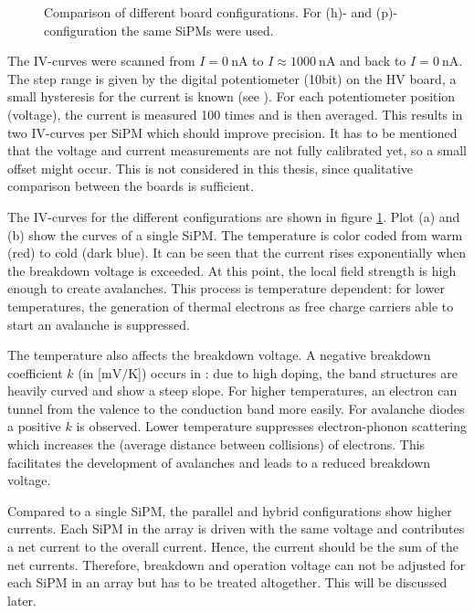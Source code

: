 \begin{figure}[h!]
	\hfill
	\hfill
	\caption[IV-curve of different board configurations]{Comparison of different board configurations. For (h)- and (p)-configuration the same SiPMs were used. }
	\label{fig:ch4:IV_comparison}
\end{figure}
The IV-curves were scanned from $I=\SI{0}{\nano\ampere}$ to $I\approx\SI{1000}{\nano\ampere}$ and back to $I=\SI{0}{\nano\ampere}$. The step range is given by the digital potentiometer (10bit) on the HV board, a small hysteresis for the current is known (see \cite{chris}). For each potentiometer position (voltage), the current is measured 100 times and is then averaged. This results in two IV-curves per SiPM which should improve precision. It has to be mentioned that the voltage and current measurements are not fully calibrated yet, so a small offset might occur. This is not considered in this thesis, since qualitative comparison between the boards is sufficient.  \par 
The IV-curves for the different configurations are shown in figure \ref{fig:ch4:IV_comparison}. Plot (a) and (b) show the curves of a single SiPM. The temperature is color coded from warm (red) to cold (dark blue). It can be seen that the current rises exponentially when the breakdown voltage is exceeded. At this point, the local field strength is high enough to create avalanches. This process is temperature dependent: for lower temperatures, the generation of thermal electrons as free charge carriers able to start an avalanche is suppressed. \par 
The temperature also affects the breakdown voltage. A negative breakdown coefficient $k$ (in [$\si{\milli\volt\per\kelvin}$]) occurs in : due to high doping, the band structures are heavily curved and show a steep slope. For higher temperatures, an electron can tunnel from the valence to the conduction band more easily. For avalanche diodes a positive $k$ is observed. Lower temperature suppresses electron-phonon scattering which increases the  (average distance between collisions) of electrons. This facilitates the development of avalanches and leads to a reduced breakdown voltage.\par 
Compared to a single SiPM, the parallel and hybrid configurations show higher currents. Each SiPM in the array is driven with the same voltage and contributes a net current to the overall current. Hence, the current should be the sum of the net currents. Therefore, breakdown and operation voltage can not be adjusted for each SiPM in an array but has to be treated altogether. This will be discussed later.

